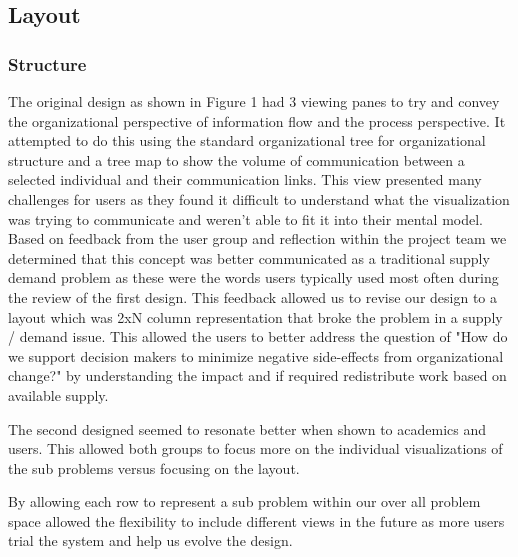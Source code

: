 \documentclass[journal]{vgtc}                %
\begin{document}
\subsection{Layout}
\subsubsection{Structure}
The original design as shown in Figure 1 had 3 viewing panes to try and convey the organizational perspective of information flow and the process perspective.  It attempted to do this using the standard organizational tree for organizational structure and a tree map to show the volume of communication between a selected individual and their communication links.  This view presented many challenges for users as they found it difficult to understand what the visualization was trying to communicate and weren't able to fit it into their mental model.  Based on feedback from the user group and reflection within the project team we determined that this concept was better communicated as a traditional supply demand problem as these were the words users typically used most often during the review of the first design.  This feedback allowed us to revise our design to a layout which was 2xN column representation that broke the problem in a supply / demand issue.  This allowed the users to better address the question of "How do we support decision makers to minimize negative side-effects from organizational change?" by understanding the impact and if required redistribute work based on available supply.

The second designed seemed to resonate better when shown to academics and users.  This allowed both groups to focus more on the individual visualizations of the sub problems versus focusing on the layout.

By allowing each row to represent a sub problem within our over all problem space allowed the flexibility to include different views in the future as more users trial the system and help us evolve the design.
\end{document}
